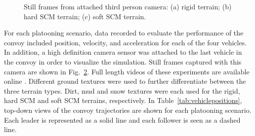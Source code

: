 \documentclass[12pt,twocolumn]{article}
\begin{document}
\begin{figure}
\begin{subfigure}{0.33\textwidth}
        \caption{} \label{fig:soft13}
    \end{subfigure}%
    \caption{Still frames from attached third person camera: (a) rigid terrain; (b) hard SCM terrain; (c) soft SCM terrain.}   
    \label{fig:simscreenshots}
\end{figure}


For each platooning scenario, data recorded to evaluate the performance of the convoy included position, velocity, and acceleration for each of the four vehicles. In addition, a high definition camera sensor was attached to the last vehicle in the convoy in order to visualize the simulation. Still frames captured with this camera are shown in Fig.~\ref{fig:simscreenshots}. Full length videos of these experiments are available online \cite{simsPaperGVSETS2020}. Different ground textures were used to further differentiate between the three terrain types. Dirt, mud and snow textures were each used for the rigid, hard SCM and soft SCM terrains, respectively. In Table~\ref{tab:vehiclepositions}, top-down views of the convoy trajectories are shown for each platooning scenario. Each leader is represented as a solid line and each follower is seen as a dashed line.
\end{document}
